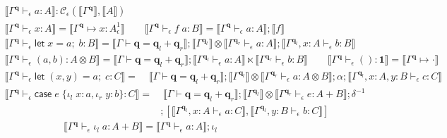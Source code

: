 \documentclass[acmsmall,screen,review]{acmart}
\newcommand{\mc}[1]{\ensuremath{\mathcal{#1}}}
\newcommand{\mb}[1]{\ensuremath{\mathbf{#1}}}
\newcommand{\ms}[1]{\ensuremath{\mathsf{#1}}}
\newcommand{\lto}{:}
\newcommand{\linl}[1]{\iota_l\;{#1}}
\newcommand{\linr}[1]{\iota_r\;{#1}}
\newcommand{\letexpr}[3]{\ensuremath{\ms{let}\;#1 = #2;\;#3}}
\newcommand{\caseexpr}[5]{\ms{case}\;#1\;\{\linl{#2} \lto #3, \linr{#4} \lto #5\}}
\newcommand{\qsp}[4]{#1 \vdash #2 = #3 + #4}
\newcommand{\cwk}[2]{#1 \mapsto #2}
\newcommand{\hasty}[4]{#1 \vdash_{#2} #3: {#4}}
\newcommand{\dnt}[1]{\llbracket{#1}\rrbracket}
\newcommand{\oneq}{1}
\begin{document}
\begin{figure}
  \begin{adjustbox}{minipage=1.1\textwidth,scale=0.9}
  \begin{gather*}
    \boxed{\dnt{\hasty{\Gamma^{\mb{q}}}{\epsilon}{a}{A}} 
      : \mc{C}_\epsilon(\dnt{\Gamma^{\mb{q}}}, \dnt{A})} \\
    \dnt{\hasty{\Gamma^{\mb{q}}}{\epsilon}{x}{A}} 
      = \dnt{\cwk{\Gamma^{\mb{q}}}{x : A^\oneq_\epsilon}}
    \qquad
    \dnt{\hasty{\Gamma^{\mb{q}}}{\epsilon}{f\;a}{B}} 
      = \dnt{\hasty{\Gamma^{\mb{q}}}{\epsilon}{a}{A}} ; \dnt{f} \\
    \dnt{\hasty{\Gamma^{\mb{q}}}{\epsilon}{\letexpr{x}{a}{b}}{B}} 
      = \dnt{\qsp{\Gamma}{\mb{q}}{\mb{q}_l}{\mb{q}_r}}
      ; \dnt{\Gamma^{\mb{q}_l}} 
        \otimes \dnt{\hasty{\Gamma^{\mb{q}_r}}{\epsilon}{a}{A}}
      ; \dnt{\hasty{\Gamma^{\mb{q}_l}, x : A}{\epsilon}{b}{B}}
    \\
    \dnt{\hasty{\Gamma^{\mb{q}}}{\epsilon}{(a, b)}{A \otimes B}}
      = \dnt{\qsp{\Gamma}{\mb{q}}{\mb{q}_l}{\mb{q}_r}}
      ; \dnt{\hasty{\Gamma^{\mb{q}_l}}{\epsilon}{a}{A}}
      \ltimes \dnt{\hasty{\Gamma^{\mb{q}_r}}{\epsilon}{b}{B}}
    \qquad
    \dnt{\hasty{\Gamma^{\mb{q}}}{\epsilon}{()}{\mb{1}}}
      = \dnt{\cwk{\Gamma^{\mb{q}}}{\cdot}}
  \end{gather*}
  \begin{align*}
    \dnt{\hasty{\Gamma^{\mb{q}}}{\epsilon}{\letexpr{(x, y)}{a}{c}}{C}}
    = & \; \dnt{\qsp{\Gamma}{\mb{q}}{\mb{q}_l}{\mb{q}_r}}
      ; \dnt{\Gamma^{\mb{q}_l}}
      \otimes \dnt{\hasty{\Gamma^{\mb{q}_r}}{\epsilon}{a}{A \otimes B}}
    ; \alpha
    ; \dnt{\hasty{\Gamma^{\mb{q}_l}, x : A, y : B}{\epsilon}{c}{C}}
  \end{align*}
  \begin{align*}
    \dnt{\hasty{\Gamma^{\mb{q}}}{\epsilon}{\caseexpr{e}{x}{a}{y}{b}}{C}}
    =& \; 
    \dnt{\qsp{\Gamma}{\mb{q}}{\mb{q}_l}{\mb{q}_r}}
    ; \dnt{\Gamma^{\mb{q}_l}} 
    \otimes \dnt{\hasty{\Gamma^{\mb{q}_r}}{\epsilon}{e}{A + B}}
    ; \delta^{-1} \\ & 
    ; [
      \dnt{\hasty{\Gamma^{\mb{q}_l}, x : A}{\epsilon}{a}{C}},
      \dnt{\hasty{\Gamma^{\mb{q}_l}, y : B}{\epsilon}{b}{C}}
    ]
  \end{align*}
  \begin{gather*}
    \dnt{\hasty{\Gamma^{\mb{q}}}{\epsilon}{\linl{a}}{A + B}}
    = \dnt{\hasty{\Gamma^{\mb{q}}}{\epsilon}{a}{A}} ; \iota_l \qquad

\end{gather*}
\end{adjustbox}
\end{figure}
\end{document}
